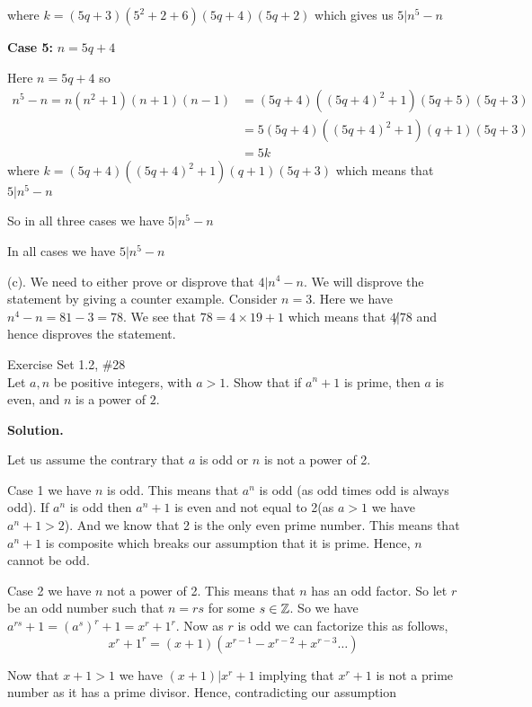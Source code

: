 \documentclass[12pt]{exam}
\begin{document}
\begin{questions}
 where $k= (5q + 3)(5^2 + 2 + 6)(5q + 4)(5q + 2) $ which gives us  $5 | n^{5} - n$


 \textbf{Case 5:}  $n = 5q + 4$

 Here $n = 5q + 4$ so  
 \begin{align*}
     n^{5} - n = n(n^2 + 1)(n + 1)(n - 1) &= (5q + 4)((5q + 4)^2 + 1)(5q + 5)(5q + 3)\\
                                          &=  5(5q + 4)((5q + 4)^2 + 1)(q + 1)(5q + 3)\\
                                          &= 5k
 \end{align*}
 where $k = (5q + 4)((5q + 4)^2 + 1)(q + 1)(5q + 3)$ which means that $5 | n^{5} - n$


 So in all three cases we have $5 | n^{5} - n$





In all cases we have $5 | n^{5} - n$

(c). We need to either prove or disprove that $4 | n^{4} - n$. We will disprove the statement by giving a counter example. Consider $n = 3$. Here we have  $n^{4} - n = 81 - 3 = 78$. We see that $78 = 4 \times 19 + 1$ which means that $4 \not | 78 $ and hence disproves the statement.




\newpage 
\question  Exercise Set 1.2, \#28  \\ 
Let $a,n$ be positive integers, with $a>1$. Show that if $a ^{n}+1$ is prime, then $a $ is even, and $n$ is a power of $2$. 

\textbf{Solution.} 

Let us assume the contrary that $a$ is odd or $n$ is not a power of 2. 

Case 1 we have $n$ is odd. This means that $a^{n}$ is odd (as odd times odd is always odd). If $a^{n}$ is odd then $a^{n} + 1$ is even and not equal to 2(as $a > 1$ we have $a^{n} + 1 > 2$). And we know that 2 is the only even prime number. This means that $a^{n} + 1$ is composite which breaks our assumption that it is prime. Hence, $n$ cannot be odd.

Case 2 we have $n$ not a power of 2. This means that $n$ has an odd factor. So let $r$ be an odd number such that $n = r s$ for some $s \in \mathbb{Z}$. So we have $a^{rs} + 1 = (a^{s})^{r} + 1 = x^{r} + 1^{r}$.  Now as  $r$ is odd we can factorize this as follows, 
$$ x^{r} + 1^{r} =  (x + 1)(x^{r - 1} - x^{r - 2} + x^{r - 3} \dots )$$ 

Now that $x + 1 > 1$ we have $(x + 1) | x^{r} + 1$ implying that $x^{r} + 1$ is not a prime number as it has a prime divisor.  Hence, contradicting our assumption 


\end{questions}
\end{document}
